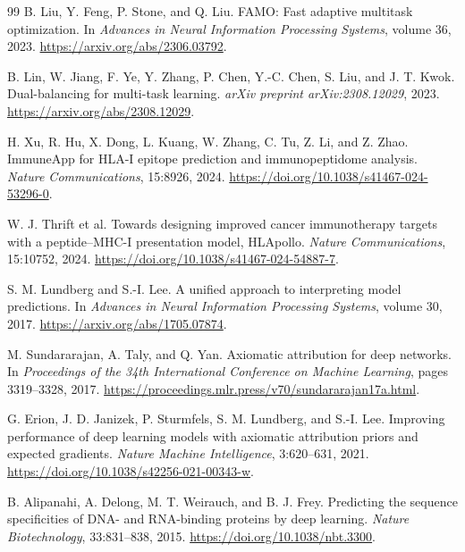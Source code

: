 \begin{thebibliography}{99}
B. Liu, Y. Feng, P. Stone, and Q. Liu.
\newblock FAMO: Fast adaptive multitask optimization.
\newblock In \emph{Advances in Neural Information Processing Systems}, volume 36, 2023.
\newblock \url{https://arxiv.org/abs/2306.03792}.

B. Lin, W. Jiang, F. Ye, Y. Zhang, P. Chen, Y.-C. Chen, S. Liu, and J. T. Kwok.
\newblock Dual-balancing for multi-task learning.
\newblock \emph{arXiv preprint arXiv:2308.12029}, 2023.
\newblock \url{https://arxiv.org/abs/2308.12029}.

H. Xu, R. Hu, X. Dong, L. Kuang, W. Zhang, C. Tu, Z. Li, and Z. Zhao.
\newblock ImmuneApp for HLA-I epitope prediction and immunopeptidome analysis.
\newblock \emph{Nature Communications}, 15:8926, 2024.
\newblock \url{https://doi.org/10.1038/s41467-024-53296-0}.

W. J. Thrift et al.
\newblock Towards designing improved cancer immunotherapy targets with a peptide--MHC-I presentation model, HLApollo.
\newblock \emph{Nature Communications}, 15:10752, 2024.
\newblock \url{https://doi.org/10.1038/s41467-024-54887-7}.

S. M. Lundberg and S.-I. Lee.
\newblock A unified approach to interpreting model predictions.
\newblock In \emph{Advances in Neural Information Processing Systems}, volume 30, 2017.
\newblock \url{https://arxiv.org/abs/1705.07874}.

M. Sundararajan, A. Taly, and Q. Yan.
\newblock Axiomatic attribution for deep networks.
\newblock In \emph{Proceedings of the 34th International Conference on Machine Learning}, pages 3319--3328, 2017.
\newblock \url{https://proceedings.mlr.press/v70/sundararajan17a.html}.

G. Erion, J. D. Janizek, P. Sturmfels, S. M. Lundberg, and S.-I. Lee.
\newblock Improving performance of deep learning models with axiomatic attribution priors and expected gradients.
\newblock \emph{Nature Machine Intelligence}, 3:620--631, 2021.
\newblock \url{https://doi.org/10.1038/s42256-021-00343-w}.

B. Alipanahi, A. Delong, M. T. Weirauch, and B. J. Frey.
\newblock Predicting the sequence specificities of DNA- and RNA-binding proteins by deep learning.
\newblock \emph{Nature Biotechnology}, 33:831--838, 2015.
\newblock \url{https://doi.org/10.1038/nbt.3300}.

\end{thebibliography}
\endgroup
